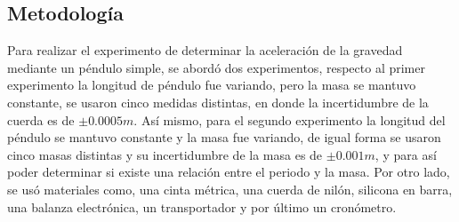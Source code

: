 \documentclass[10pt,a4paper]{article}
\begin{document}
\begin{multicols}{2}
\section{Metodología} %
Para realizar el experimento de determinar la aceleración de la gravedad mediante un péndulo simple, se abordó dos experimentos, respecto al primer experimento la longitud de péndulo fue variando, pero la masa se mantuvo constante, se usaron cinco medidas distintas, en donde la incertidumbre de la cuerda es de $ \pm 0.0005m$. Así mismo, para el segundo experimento la longitud del péndulo se mantuvo constante y la masa fue variando, de igual forma se usaron cinco masas distintas y su incertidumbre de la masa es de $ \pm 0.001m$, y para así poder determinar si existe una relación entre el periodo y la masa. Por otro lado, se usó materiales como, una cinta métrica, una cuerda de nilón, silicona en barra, una balanza electrónica, un transportador y por último un cronómetro. \\


\end{multicols}
\end{document}
